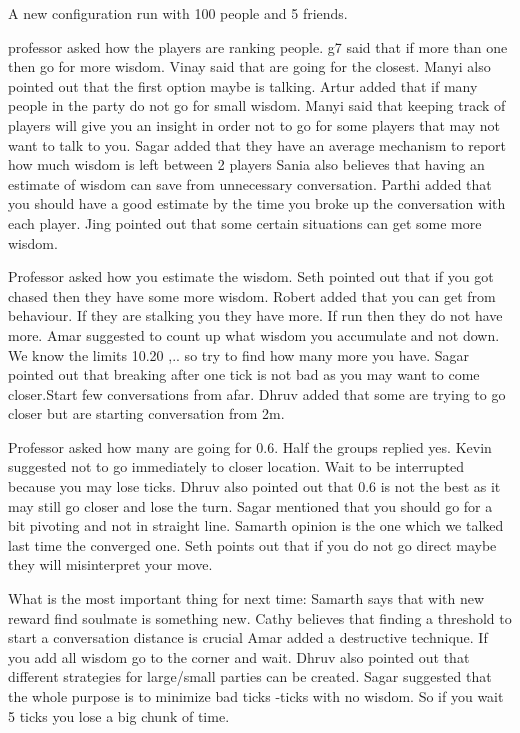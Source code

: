 A new configuration run with 100 people and 5 friends.

professor asked how the players are ranking people.
g7 said that if more than one then go for more wisdom.
Vinay said that are going for the closest.
Manyi also pointed out that the first option maybe is talking.
Artur added that if many people in the party do not go for small wisdom.
Manyi said that keeping track of players will give you an insight in order not to go for some players that may not want to talk to you.
Sagar added that they have an average mechanism to report how much wisdom is left between 2 players
Sania also believes that having an estimate of wisdom can save from unnecessary conversation.
Parthi added that you should have a good estimate by the time you broke up the conversation with each player.
Jing pointed out that some certain situations can get some more wisdom.

Professor asked how you estimate the wisdom.
Seth pointed out that if you got chased then they have some more wisdom.
Robert added that you can get from behaviour. If they are stalking you they have more. If run then they do not have more.
Amar suggested to count up what wisdom you accumulate and not down. We know the limits 10.20 ,.. so try to find how many more you have.
Sagar pointed out that breaking after one tick is not bad as you may want to come closer.Start few conversations from afar. 
Dhruv added that some are trying to go closer but are starting conversation from 2m.

Professor asked how many are going for 0.6.
Half the groups replied yes.
Kevin suggested not to go immediately to closer location. Wait to be interrupted because you may lose ticks.
Dhruv also pointed out that 0.6 is not the best as it may still go closer and lose the turn.
Sagar mentioned that you should go for a bit pivoting and not in straight line.
Samarth opinion is the one which we talked last time the converged one.
Seth points out that if you do not go direct maybe they will misinterpret your move.

What is the most important thing for next time:
Samarth says that with new reward find soulmate is something new.
Cathy believes that finding a threshold to start a conversation distance is crucial
Amar added a destructive technique. If you add all wisdom go to the corner and wait.
Dhruv also pointed out that different strategies for large/small parties can be created.
Sagar suggested that the whole purpose is to minimize bad ticks -ticks with no wisdom.
So if you wait 5 ticks you lose a big chunk of time.
